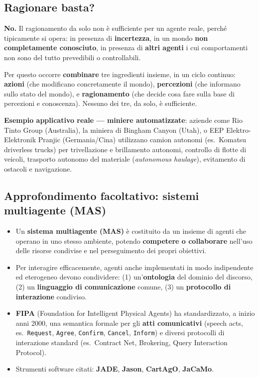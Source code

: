 \documentclass[11pt,a4paper]{report}
\begin{document}
\subsection{Ragionare basta?}

\textbf{No.} Il ragionamento da solo non è sufficiente per un agente reale, perché tipicamente si opera: in presenza di \textbf{incertezza}, in un mondo \textbf{non completamente conosciuto}, in presenza di \textbf{altri agenti} i cui comportamenti non sono del tutto prevedibili o controllabili.

Per questo occorre \textbf{combinare} tre ingredienti insieme, in un ciclo continuo: \textbf{azioni} (che modificano concretamente il mondo), \textbf{percezioni} (che informano sullo stato del mondo), e \textbf{ragionamento} (che decide cosa fare sulla base di percezioni e conoscenza). Nessuno dei tre, da solo, è sufficiente.

\textbf{Esempio applicativo reale --- miniere automatizzate}: aziende come Rio Tinto Group (Australia), la miniera di Bingham Canyon (Utah), o EEP Elektro-Elektronik Pranjic (Germania/Cina) utilizzano camion autonomi (es.\ Komatsu driverless trucks) per trivellazione e brillamento autonomi, controllo di flotte di veicoli, trasporto autonomo del materiale (\emph{autonomous haulage}), evitamento di ostacoli e navigazione.

\subsection*{Approfondimento facoltativo: sistemi multiagente (MAS)}

\begin{itemize}
  \item Un \textbf{sistema multiagente (MAS)} è costituito da un insieme di agenti che operano in uno stesso ambiente, potendo \textbf{competere o collaborare} nell'uso delle risorse condivise e nel perseguimento dei propri obiettivi.
  \item Per interagire efficacemente, agenti anche implementati in modo indipendente ed eterogeneo devono condividere: (1) un'\textbf{ontologia} del dominio del discorso, (2) un \textbf{linguaggio di comunicazione} comune, (3) un \textbf{protocollo di interazione} condiviso.
  \item \textbf{FIPA} (Foundation for Intelligent Physical Agents) ha standardizzato, a inizio anni 2000, una semantica formale per gli \textbf{atti comunicativi} (speech acts, es.\ \texttt{Request}, \texttt{Agree}, \texttt{Confirm}, \texttt{Cancel}, \texttt{Inform}) e diversi protocolli di interazione standard (es.\ Contract Net, Brokering, Query Interaction Protocol).
  \item Strumenti software citati: \textbf{JADE}, \textbf{Jason}, \textbf{CartAgO}, \textbf{JaCaMo}.
\end{itemize}
\end{document}
